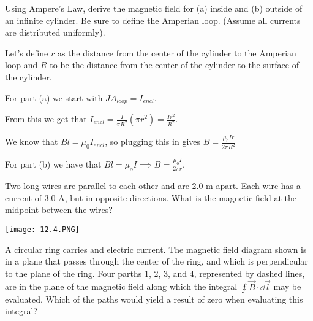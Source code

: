 \documentclass[../em.tex]{subfiles}
\begin{document}
\begin{example}
    Using Ampere's Law, derive the magnetic field for (a) inside and (b) outside of an infinite cylinder. Be sure to define the Amperian loop. (Assume all currents are distributed uniformly).

    Let's define $r$ as the distance from the center of the cylinder to the Amperian loop and $R$ to be the distance from the center of the cylinder to the surface of the cylinder.

    For part (a) we start with $JA_{loop}=I_{encl}$.

    From this we get that $I_{encl}=\frac{I}{\pi R^2}(\pi r^2)=\frac{Ir^2}{R^2}$.

    We know that $Bl=\mu_0I_{encl}$, so plugging this in gives $B=\frac{\mu_0Ir}{2\pi R^2}$

    For part (b) we have that $Bl=\mu_o I \implies B=\frac{\mu_0 I}{2\pi r}$.
\end{example}

\ex Two long wires are parallel to each other and are 2.0 m apart. Each wire has a current of 3.0 A, but in opposite directions. What is the magnetic field at the midpoint between the wires?

\pagebreak
\ex \begin{center}
    \texttt{[image: 12.4.PNG]}
\end{center}
A circular ring carries and electric current. The magnetic field diagram shown is in a plane that passes through the center of the ring, and which is perpendicular to the plane of the ring.
Four parths 1, 2, 3, and 4, represented by dashed lines, are in the plane of the magnetic field along which the integral $\oint \vec{B}\cdot \dd \vec{l}$ may be evaluated. Which of the paths would yield a result of zero when evaluating this integral?
\end{document}
